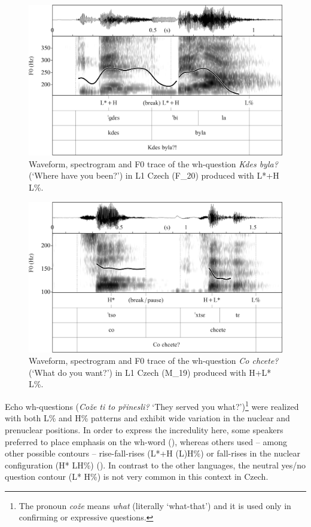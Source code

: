 \begin{figure}
\includegraphics[width=\textwidth]{figures/Figure_4.109.png}
\caption{Waveform, spectrogram and F0 trace of the wh-question \textit{Kdes byla?} (‘Where have you been?’) in L1 Czech (F\_20) produced with L*+H L\%.}
\label{fig:4.109}
\end{figure}

\begin{figure}
\includegraphics[width=\textwidth]{figures/Figure_4.110.png}



\caption{Waveform, spectrogram and F0 trace of the wh-question \textit{Co chcete?} (‘What do you want?’) in L1 Czech (M\_19) produced with H+L* L\%.}
\label{fig:4.110}
\end{figure}

Echo wh-questions (\textit{Cože ti to přinesli?} ‘They served you what?’)\footnote{The pronoun \textit{cože} means \textit{what} (literally ‘what-that’) and it is used only in confirming or expressive questions.} were realized with both L\% and H\% patterns and exhibit wide variation in the nuclear and prenuclear positions. In order to express the incredulity here, some speakers preferred to place emphasis on the wh-word (), whereas others used -- among other possible contours -- rise-fall-rises (L*+H (L)H\%) or fall-rises in the nuclear configuration (H* LH\%) (). In contrast to the other languages, the neutral yes/no question contour (L* H\%) is not very common in this context in Czech.


